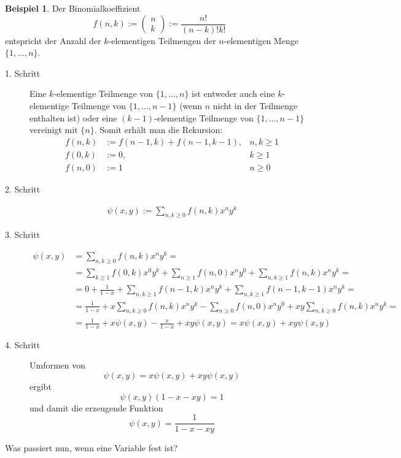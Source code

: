 \documentclass[a4paper,ngerman]{scrartcl}
\theoremstyle{definition}
\newtheorem{bsp}[defn]{Beispiel}
\theoremstyle{plain}
\theoremstyle{remark}
\begin{document}
\begin{bsp}
Der Binomialkoeffizient
\[f(n,k) := \left(\begin{matrix} n \\ k\end{matrix}\right) := \frac{n!}{(n-k)!k!}\]
entspricht der Anzahl der $k$-elementigen Teilmengen der $n$-elementigen Menge $\{1, \dots, n\}$.
\begin{description}
	\item[1. Schritt]
		Eine $k$-elementige Teilmenge von $\{1, \dots, n\}$ ist entweder auch eine $k$-elementige Teilmenge von $\{1, \dots, n-1\}$ (wenn $n$ nicht in der Teilmenge enthalten ist) oder eine $(k-1)$-elementige Teilmenge von $\{1, \dots, n-1\}$ vereinigt mit $\{n\}$. Somit erhält man die Rekursion:
		\begin{align*}
			f(n,k) &:= f(n-1,k) + f(n-1,k-1), 	&n,k \geq 1 \\
			f(0,k) &:= 0, 						&k \geq 1   \\
			f(n,0) &:= 1						&n \geq 0
		\end{align*}
	\item[2. Schritt]
		\begin{align*}\psi(x,y) := \sum_{n,k \geq 0} f(n,k) x^n y^k \end{align*}
	\item[3. Schritt]	
		\begin{align*}
			\psi(x,y) 	&= \sum_{n,k \geq 0} f(n,k) x^n y^k = \\
						&= \sum_{k \geq 1} f(0,k) x^0 y^k + \sum_{n \geq 1} f(n,0) x^n y^0 + \sum_{n,k \geq 1} f(n,k) x^n y^k = \\
						&= 0 + \frac{1}{1-x} + \sum_{n,k \geq 1} f(n-1,k) x^n y^k + \sum_{n,k \geq 1} f(n-1,k-1) x^n y^k = \\
						&= \frac{1}{1-x} + x\sum_{n,k \geq 0} f(n,k) x^n y^k - \sum_{n \geq 0} f(n,0) x^n y^0 + xy\sum_{n,k \geq 0} f(n,k) x^n y^k = \\
						&= \frac{1}{1-x} + x\psi(x,y) - \frac{x}{1-x} +xy\psi(x,y) = x\psi(x,y) + xy\psi(x,y) 
		\end{align*}
	\item[4. Schritt]
		Umformen von
		\[\psi(x,y) = x\psi(x,y) + xy\psi(x,y)\]
		ergibt
		\[\psi(x,y)(1-x-xy) = 1\]
		und damit die erzeugende Funktion
		\[\psi(x,y) = \frac{1}{1-x-xy}\]
\end{description}

Was passiert nun, wenn eine Variable fest ist?


\end{bsp}
\end{document}
